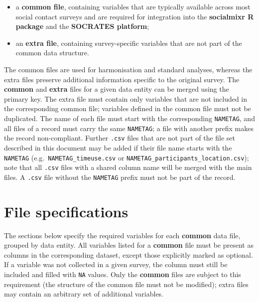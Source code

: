 \documentclass[11pt,a4paper]{article}
\begin{document}
\begin{itemize}
    \item a \textbf{common file}, containing variables that are typically available across most social contact surveys and are required for integration into the \textbf{socialmixr R package} and the \textbf{SOCRATES platform};
    \item an \textbf{extra file}, containing survey-specific variables that are not part of the common data structure. 
\end{itemize}
\noindent The common files are used for harmonisation and standard analyses, whereas the extra files preserve additional information specific to the original survey. 
The \textbf{common} and \textbf{extra} files for a given data entity can be merged using the primary key. 
The extra file must contain only variables that are not included in the corresponding common file; variables defined in the common file must not be duplicated. 
The name of each file must start with the corresponding \texttt{NAMETAG}, and all files of a record must carry the same \texttt{NAMETAG}; a file with another prefix makes the record non-compliant. Further \texttt{.csv} files that are not part of the file set described in this document may be added if their file name starts with the \texttt{NAMETAG} (e.g.\ \texttt{NAMETAG\_timeuse.csv} or \texttt{NAMETAG\_participants\_location.csv}); note that all \texttt{.csv} files with a shared column name will be merged with the main files. A \texttt{.csv} file without the \texttt{NAMETAG} prefix must not be part of the record.

\section{File specifications} 
\label{sec:file_spesifications}
\noindent The sections below specify the required variables for each \textbf{common} data file, grouped by data entity. All variables listed for a \textbf{common} file must be present as columns in the corresponding dataset, except those explicitly marked as optional. If a variable was not collected in a given survey, the column must still be included and filled with \texttt{NA} values. Only the \textbf{common} files are subject to this requirement (the structure of the common file must not be modified); extra files may contain an arbitrary set of additional variables. 
\end{document}
